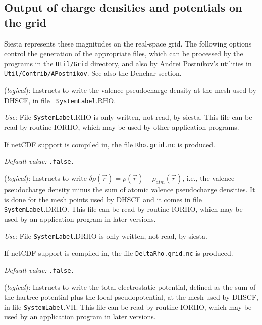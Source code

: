 \documentclass[11pt]{article}
\begin{document}
\vspace{5pt}
\subsection{Output of charge densities and potentials on the grid}

{\sc Siesta} represents these magnitudes on the real-space grid. The
following options control the generation of the appropriate files,
which can be processed by the programs in the {\tt Util/Grid}
directory, and also by Andrei Postnikov's utilities in {\tt
  Util/Contrib/APostnikov}. See also the Denchar section.

\begin{description}
\itemsep 10pt
\parsep 0pt

\item[{\bf SaveRho}] ({\it logical}):  Instructs to write the
  valence pseudocharge density at the mesh used by DHSCF, in file {\tt
    SystemLabel}.RHO. 

{\it Use:} File {\tt SystemLabel}.RHO is only written, not read, by siesta.
This file can be read by routine IORHO, which may be used by other
application programs.

If netCDF support is compiled in, the file {\tt Rho.grid.nc} is produced.

{\it Default value:} {\tt .false.}
        

\item[{\bf SaveDeltaRho}] ({\it logical}): 
Instructs to write $\delta \rho(\vec r) = \rho(\vec r) - \rho_{atm}(\vec r)$,
i.e., the valence pseudocharge density minus the sum of atomic valence
pseudocharge densities. It is done for the mesh points used by DHSCF and it
comes in file {\tt SystemLabel}.DRHO. This file can be read by routine IORHO,
which may be used by an application program in later versions.

{\it Use:} File {\tt SystemLabel}.DRHO is only written, not read, by siesta.

If netCDF support is compiled in, the file {\tt DeltaRho.grid.nc} is produced.

{\it Default value:} {\tt .false.}
        

\item[{\bf SaveElectrostaticPotential}] ({\it logical}): 
Instructs to write the total electrostatic potential, defined as the
sum of the hartree potential plus the local pseudopotential, at the
mesh used by DHSCF,
in file {\tt SystemLabel}.VH. This file can be read by routine IORHO,
which may be used by an application program in later versions.


\end{description}
\end{document}
